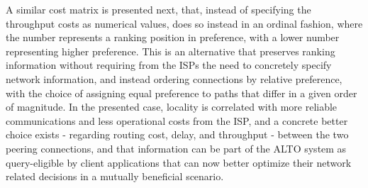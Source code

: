     A similar cost matrix is presented next, that, instead of specifying the throughput costs as numerical values, does so instead in an ordinal fashion, where the number represents a ranking position in preference, with a lower number representing higher preference.
    This is an alternative that preserves ranking information without requiring from the ISPs the need to concretely specify network information, and instead ordering connections by relative preference, with the choice of assigning equal preference to paths that differ in a given order of magnitude.
    In the presented case, locality is correlated with more reliable communications and less operational costs from the ISP, and a concrete better choice exists - regarding routing cost, delay, and throughput - between the two peering connections, and that information can be part of the ALTO system as query-eligible by client applications that can now better optimize their network related decisions in a mutually beneficial scenario.

